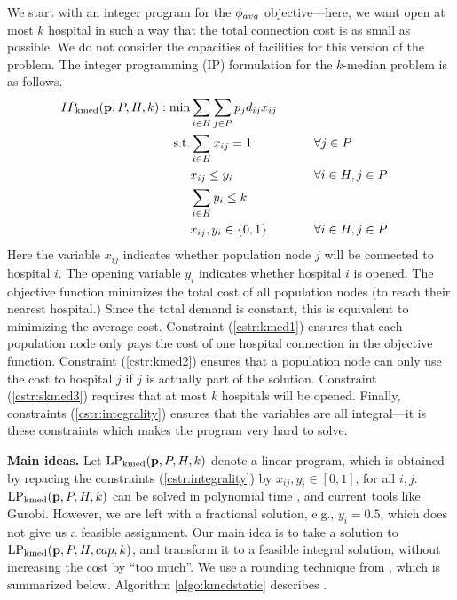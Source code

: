 We start with an integer program for the $\phi_{avg}$ objective---here,
we want open at most $k$ hospital in such a way that the total connection cost is as small as possible. 
We do not consider the capacities of facilities for this version of the problem.
The integer programming (IP) formulation for the $k$-median problem is as follows.
\begin{alignat}{2}  
  IP_{\text{kmed}}(\mathbf{p}, P, H, k): \min  &  \sum_{i \in H}\sum_{j \in P} p_j d_{ij} x_{ij} \nonumber\\
    \text{s.t.} & \sum_{i \in H} x_{ij} = 1    &\qquad& \forall j \in P\label{cstr:kmed1} \\
                             &  x_{ij} \leq y_i      && \forall i \in H, j \in P \label{cstr:kmed2}\\
                             &  \sum_{i\in H} y_{i} \leq k      &&  \label{cstr:skmed3}\\
                             & x_{ij},  y_i \in \{0,1\} && \forall i \in H, j \in P \label{cstr:integrality}
\end{alignat}
Here the variable $x_{ij}$ indicates whether population node $j$ will be connected to hospital $i$. The opening variable $y_i$ indicates whether hospital $i$ is opened. The objective function minimizes the total cost of all population nodes (to reach their nearest hospital.) Since the total demand is constant, this is equivalent to minimizing the average cost. Constraint (\ref{cstr:kmed1}) ensures that each population node only pays the cost of one hospital connection in the objective function. Constraint (\ref{cstr:kmed2}) ensures that a population node can only use the cost to hospital $j$ if $j$ is actually part of the solution. Constraint (\ref{cstr:skmed3}) requires that at most $k$ hospitals will be opened.
Finally, constraints (\ref{cstr:integrality}) ensures that the variables are all integral---it is these constraints
which makes the program very hard to solve.

\noindent
\textbf{Main ideas.}
Let $\text{LP}_{\text{kmed}}(\mathbf{p}, P, H, k)$ denote a linear program, which is obtained by repacing the constraints
(\ref{cstr:integrality}) by $x_{ij},  y_i \in [0,1]$, for all $i, j$.
$\text{LP}_{\text{kmed}}(\mathbf{p}, P, H, k)$ can be solved in polynomial time \cite{gls:book}, and current tools like 
Gurobi.  However, we are left with a fractional solution, e.g., $y_i=0.5$, which does not 
give us a feasible assignment.
Our main idea is to take a solution to $\text{LP}_{\text{kmed}}(\mathbf{p}, P, H, cap, k)$, 
and transform it to a feasible integral solution,
without increasing the cost by ``too much''.
We use a rounding technique from \cite{srin:level-sets}, 
which is summarized below.
Algorithm \ref{algo:kmedstatic} describes \algokmedstatic{}.

